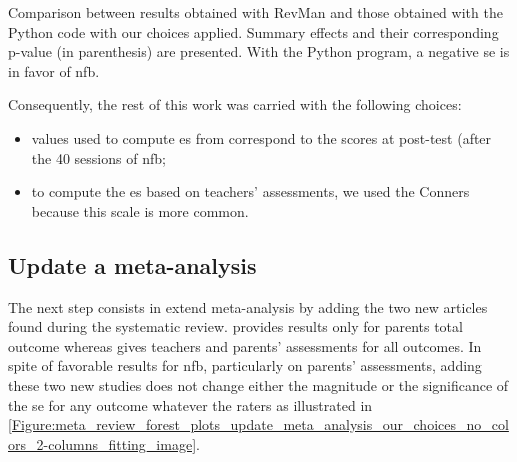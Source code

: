 \begin{table}[h!]
  \centering
  \caption{Comparison between \citet{Cortese2016} results obtained with RevMan \citep{RevMan} and those obtained with the Python code with our 
	choices applied. Summary effects and their corresponding p-value (in parenthesis) are presented. With the Python program, a negative \gls{se}
	is in favor of \gls{nfb}.}

  \label{Table:meta_review_comparison_revman_and_python_with_choices}
\end{table}

Consequently, the rest of this work was carried with the following choices:
\begin{itemize}
    \item values used to compute \gls{es} from \citeauthor{Arnold2014} correspond to the scores at post-test (after the 40 sessions of \gls{nfb};  
    \item to compute the \gls{es} based on teachers' assessments, we used the Conners because this scale is more common.
\end{itemize}

\subsection{Update a meta-analysis}

The next step consists in extend \citeauthor{Cortese2016} meta-analysis by adding the two new articles \citep{Strehl2017, Baumeister2016} found 
during the systematic review. \citet{Baumeister2016} provides results only for parents total outcome whereas \citet{Strehl2017} gives teachers 
and parents' assessments for all outcomes. In spite of favorable results for \gls{nfb}, particularly on parents' assessments, adding these two 
new studies does not change either the magnitude or the significance of the \gls{se} for any outcome whatever the raters
as illustrated in \cref{Figure:meta_review_forest_plots_update_meta_analysis_our_choices_no_colors_2-columns_fitting_image}. 
 

